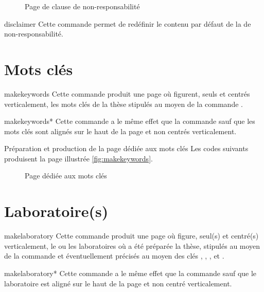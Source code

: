 \begin{figure}[htbp]
  \centering
  \caption{Page de clause de non-responsabilité}
  \label{fig:disclaimerpage}
\end{figure}

\begin{docCommand}{disclaimer}{}
  Cette commande permet de redéfinir le contenu par défaut de la
   de non-responsabilité.
\end{docCommand}

\section{Mots clés}\label{sec:mots-cles}

\begin{docCommand}{makekeywords}{}
  Cette commande produit une page où figurent, seuls et centrés
  verticalement, les mots clés de la thèse stipulés au moyen de la commande
  .
\end{docCommand}
%
\begin{docCommand}{makekeywords*}{}
  Cette commande a le même effet que la commande
   sauf que les mots clés sont alignés sur le haut de la
  page et non centrés verticalement.
\end{docCommand}

\begin{dbexample}{Préparation et production de la page dédiée aux mots clés}{}
  Les codes suivants produisent la page illustrée \vref{fig:makekeywords}.
%
\end{dbexample}

\begin{figure}[htbp]
  \centering {}%
  \caption{Page dédiée aux mots clés}
  \label{fig:makekeywords}
\end{figure}

\section{Laboratoire(s)}
\label{sec:laboratoires}

\begin{docCommand}{makelaboratory}{}
  Cette commande produit une page où figure, seul(s) et centré(s)
  verticalement, le ou les laboratoires où a été préparée la thèse, stipulés au
  moyen de la commande  et éventuellement précisés au moyen
  des clés , , , 
  et .
\end{docCommand}
%
\begin{docCommand}{makelaboratory*}{}
  Cette commande a le même effet que la commande
   sauf que le laboratoire est aligné sur le haut de la
  page et non centré verticalement.
\end{docCommand}

